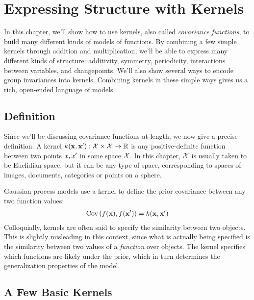 
\inbpdocument

\chapter{Expressing Structure with Kernels}
\label{ch:kernels}

In this chapter, we'll show how to use kernels, also called \emph{covariance functions}, to build many different kinds of models of functions.
By combining a few simple kernels through addition and multiplication, we'll be able to express many different kinds of structure: additivity, symmetry, periodicity, interactions between variables, and changepoints.
We'll also show several ways to encode group invariances into kernels.
Combining kernels in these simple ways gives us a rich, open-ended language of models.


\section{Definition}

Since we'll be discussing covariance functions at length, we now give a precise definition.
A kernel $k({\bf{x}}, {\bf{x}}') : \mathcal{X} \times \mathcal{X} \to \mathbb{R}$ is any positive-definite function between two points $x, x'$ in some space $\mathcal{X}$.
In this chapter, $\mathcal{X}$ is usually taken to be Euclidian space, but it can be any type of space, corresponding to spaces of images, documents, categories or points on a sphere.

Gaussian process models use a kernel to define the prior covariance between any two function values:
%
\begin{align}
\textrm{Cov}\left(f({\bf{x}}), f({\bf{x}}') \right) = k({\bf{x}},{\bf{x}}')
\end{align}
%
Colloquially, kernels are often said to specify the similarity between two objects.
This is slightly misleading in this context, since what is actually being specified is the similarity between two values of a \emph{function} over objects.
The kernel specifies which functions are likely under the \gp{} prior, which in turn determines the generalization properties of the model.





\section{A Few Basic Kernels}
\label{sec:based-kernels}

